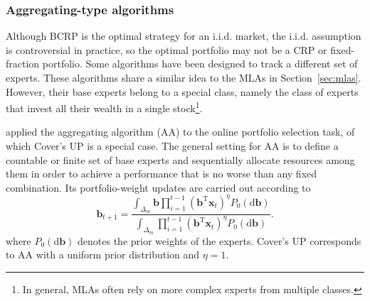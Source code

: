 %
%
%
%
%
%
%
%


\subsubsection{Aggregating-type algorithms}
\label{sec:aa-algos}

Although BCRP is the optimal strategy for an i.i.d. market, the i.i.d. assumption is controversial in practice, so the optimal portfolio may not be a CRP or fixed-fraction portfolio. Some algorithms have been designed to track a different set of experts. These algorithms share a similar idea to the MLAs in Section~\ref{sec:mlas}. However, their base experts belong to a special class, namely the class of experts that invest all their wealth in a single stock\footnote{In general, MLAs often rely on more complex experts from multiple classes.}.

\citet{vovk98} applied the aggregating algorithm (AA) \citep{vovk90} to the online portfolio selection task, of which Cover's UP is a special case. The general setting for AA is to define a countable or finite set of base experts and sequentially allocate resources among them in order to achieve a performance that is no worse than any fixed combination. Its portfolio-weight updates are carried out according to \citep[Algorithm~1]{vovk98}
\begin{equation}
	\mathbf{b}_{t+1} = \frac{\int_{\Delta_m} \mathbf{b}\prod_{i=1}^{t-1}(\mathbf{b}^\text{T}\mathbf{x}_t)^\eta P_{0}(\mathrm{d}\mathbf{b})}{\int_{\Delta_m}\prod_{i=1}^{t-1}(\mathbf{b}^\text{T}\mathbf{x}_t)^\eta P_{0}(\mathrm{d}\mathbf{b})}.
\end{equation}
where $P_{0}(\mathrm{d}\mathbf{b})$ denotes the prior weights of the experts. Cover's UP corresponds to AA with a uniform prior distribution and $\eta = 1$.

